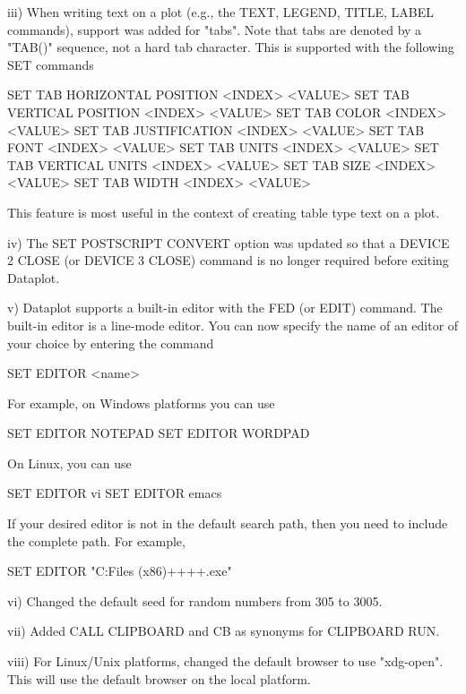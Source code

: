     iii) When writing text on a plot (e.g., the TEXT, LEGEND, TITLE,
         LABEL commands), support was added for "tabs".  Note that
         tabs are denoted by a "TAB()" sequence, not a hard tab
         character.  This is supported with the following SET commands

            SET TAB HORIZONTAL POSITION  <INDEX> <VALUE>
            SET TAB VERTICAL   POSITION  <INDEX> <VALUE>
            SET TAB COLOR                <INDEX> <VALUE>
            SET TAB JUSTIFICATION        <INDEX> <VALUE>
            SET TAB FONT                 <INDEX> <VALUE>
            SET TAB UNITS                <INDEX> <VALUE>
            SET TAB VERTICAL UNITS       <INDEX> <VALUE>
            SET TAB SIZE                 <INDEX> <VALUE>
            SET TAB WIDTH                <INDEX> <VALUE>

         This feature is most useful in the context of creating
         table type text on a plot.

     iv) The SET POSTSCRIPT CONVERT option was updated so that a
         DEVICE 2 CLOSE (or DEVICE 3 CLOSE) command is no longer required
         before exiting Dataplot.

      v) Dataplot supports a built-in editor with the FED (or EDIT)
         command.  The built-in editor is a line-mode editor.  You can
         now specify the name of an editor of your choice by entering
         the command

             SET EDITOR <name>

         For example, on Windows platforms you can use

             SET EDITOR NOTEPAD
             SET EDITOR WORDPAD

         On Linux, you can use

             SET EDITOR vi
             SET EDITOR emacs

         If your desired editor is not in the default search path, then
         you need to include the complete path.  For example,

             SET EDITOR "C:\Program Files (x86)\notepad++\notepad++.exe"

     vi) Changed the default seed for random numbers from 305 to 3005.

    vii) Added CALL CLIPBOARD and CB as synonyms for CLIPBOARD RUN.

   viii) For Linux/Unix platforms, changed the default browser to use
         "xdg-open".  This will use the default browser on the local
         platform.

